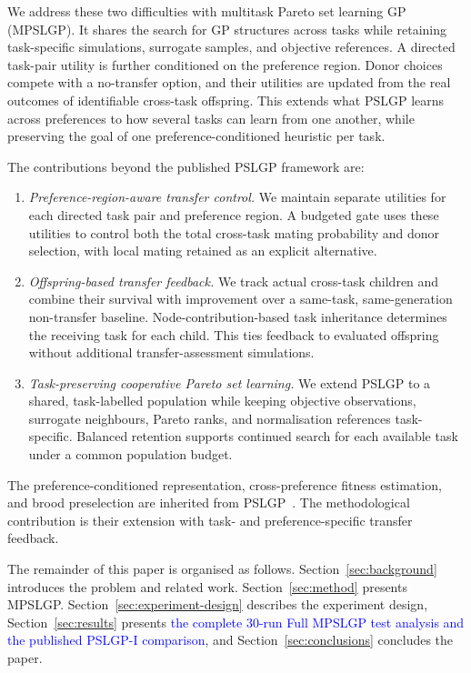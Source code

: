 \documentclass[10pt,journal]{IEEEtran}
\newcommand{\revision}[1]{\textcolor{blue}{#1}}
\begin{document}
We address these two difficulties with multitask Pareto set learning GP (MPSLGP). It shares the search for GP structures across tasks while retaining task-specific simulations, surrogate samples, and objective references. A directed task-pair utility is further conditioned on the preference region. Donor choices compete with a no-transfer option, and their utilities are updated from the real outcomes of identifiable cross-task offspring. This extends what PSLGP learns across preferences to how several tasks can learn from one another, while preserving the goal of one preference-conditioned heuristic per task.

The contributions beyond the published PSLGP framework are:
\begin{enumerate}[leftmargin=*,nosep]
    \item \emph{Preference-region-aware transfer control.} We maintain separate utilities for each directed task pair and preference region. A budgeted gate uses these utilities to control both the total cross-task mating probability and donor selection, with local mating retained as an explicit alternative.
    \item \emph{Offspring-based transfer feedback.} We track actual cross-task children and combine their survival with improvement over a same-task, same-generation non-transfer baseline. Node-contribution-based task inheritance determines the receiving task for each child. This ties feedback to evaluated offspring without additional transfer-assessment simulations.
    \item \emph{Task-preserving cooperative Pareto set learning.} We extend PSLGP to a shared, task-labelled population while keeping objective observations, surrogate neighbours, Pareto ranks, and normalisation references task-specific. Balanced retention supports continued search for each available task under a common population budget.
\end{enumerate}
The preference-conditioned representation, cross-preference fitness estimation, and brood preselection are inherited from PSLGP~\cite{xu2026pslgp}. The methodological contribution is their extension with task- and preference-specific transfer feedback.

The remainder of this paper is organised as follows. Section~\ref{sec:background} introduces the problem and related work. Section~\ref{sec:method} presents MPSLGP. Section~\ref{sec:experiment-design} describes the experiment design, Section~\ref{sec:results} presents \revision{the complete 30-run Full MPSLGP test analysis and the published PSLGP-I comparison}, and Section~\ref{sec:conclusions} concludes the paper.
\end{document}
